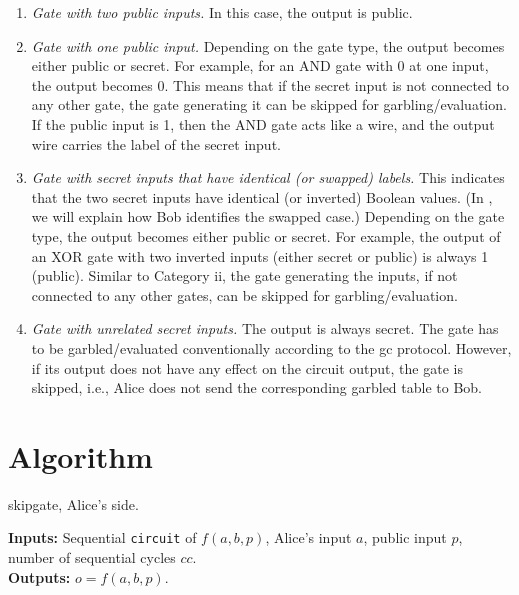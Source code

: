\begin{enumerate}[label=\roman*]
  \item \textit{Gate with two public inputs.}
    In this case, the output is public.
  \item \textit{Gate with one public input.}
  	Depending on the gate type, the output becomes either public or secret.
  	For example, for an AND gate with 0 at one input, the output becomes 0.
  	This means that if the secret input is not connected to any other gate, the gate generating it can be skipped for garbling/evaluation.
  	If the public input is 1, then the AND gate acts like a wire, and the output wire carries the label of the secret input.
  \item \textit{Gate with secret inputs that have identical (or swapped) labels.}
    This indicates that the two secret inputs have identical (or inverted) Boolean values.
    (In , we will explain how Bob identifies the swapped case.)
    Depending on the gate type, the output becomes either public or secret.
    For example, the output of an XOR gate with two inverted inputs (either secret or public) is always 1 (public).
  	Similar to Category ii, the gate generating the inputs, if not connected to any other gates, can be skipped for garbling/evaluation.
  \item \textit{Gate with unrelated secret inputs.}
  	The output is always secret.
  	The gate has to be garbled/evaluated conventionally according to the \acrshort{gc} protocol.
    However, if its output does not have any effect on the circuit output, the gate is skipped, i.e., Alice does not send the corresponding garbled table to Bob.
\end{enumerate}

\section{Algorithm}\label{sec:skipgate-alg}

\begin{algorithm}
\caption{\gls{skipgate}, Alice's side.}\label{alg:alice}
\textbf{Inputs:} Sequential \texttt{circuit} of $f(a,b,p)$, Alice's input $a$, public input $p$, number of sequential cycles $cc$.\\
\textbf{Outputs:} $o = f(a,b,p)$.\\
\begin{algorithmic}[1]
\ENDFOR
{}
\end{algorithmic}
\end{algorithm}

